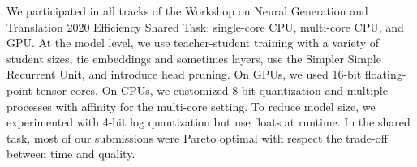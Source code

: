 We participated in all tracks of the Workshop on Neural Generation and Translation 2020 Efficiency Shared Task: single-core CPU, multi-core CPU, and GPU. At the model level, we use teacher-student training with a variety of student sizes, tie embeddings and sometimes layers, use the Simpler Simple Recurrent Unit, and introduce head pruning. On GPUs, we used 16-bit floating-point tensor cores. On CPUs, we customized 8-bit quantization and multiple processes with affinity for the multi-core setting. To reduce model size, we experimented with 4-bit log quantization but use floats at runtime. In the shared task, most of our submissions were Pareto optimal with respect the trade-off between time and quality.
